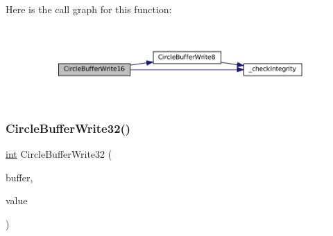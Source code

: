 Here is the call graph for this function\+:
\nopagebreak
\begin{figure}[H]
\begin{center}
\leavevmode
\includegraphics[width=350pt]{circle-buffer_8c_ababcf59a66d885ec2f94f1f189c49f9e_cgraph}
\end{center}
\end{figure}
\mbox{\label{circle-buffer_8c_a056daa52414e0ab9796fa8079100bd82}} 
\subsubsection{\texorpdfstring{Circle\+Buffer\+Write32()}{CircleBufferWrite32()}}
{\footnotesize\ttfamily \mbox{\hyperlink{ioapi_8h_a787fa3cf048117ba7123753c1e74fcd6}{int}} Circle\+Buffer\+Write32 (\begin{DoxyParamCaption}\item[{struct Circle\+Buffer $\ast$}]{buffer,  }\item[{int32\+\_\+t}]{value }\end{DoxyParamCaption})}

